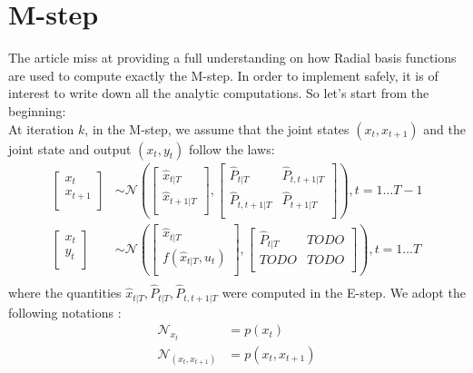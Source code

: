 \section{M-step}

The article miss at providing a full understanding on how Radial basis functions are used to compute exactly the M-step. In order to implement safely, it is of interest to write down all the analytic computations. So let's start from the beginning:\\

At iteration $k$, in the M-step, we assume that the joint states $(x_t, x_{t+1})$ and the joint state and output $(x_t, y_t)$ follow the laws:
\begin{align*}
  \left[ \begin{array}{c} x_{t}\\ x_{t+1}\\ \end{array} \right] &\sim
    \mathcal{N}\left(
      \left[ \begin{array}{c} \hat{x}_{t|T}\\ \hat{x}_{t+1|T}\\ \end{array} \right],
      \left[ \begin{array}{cc} \hat{P}_{t|T} & \hat{P}_{t,t+1|T}\\ \hat{P}_{t,t+1|T} & \hat{P}_{t+1|T}\\ \end{array} \right]
    \right),
    t=1 \ldots T-1\\
  \left[ \begin{array}{c} x_{t}\\ y_{t}\\ \end{array} \right] &\sim
    \mathcal{N}\left(
      \left[ \begin{array}{c} \hat{x}_{t|T}\\  f(\hat{x}_{t|T}, u_t)\\ \end{array} \right],
      \left[ \begin{array}{cc} \hat{P}_{t|T} & TODO \\ TODO & TODO\\ \end{array} \right]
    \right),
    t=1 \ldots T\\
\end{align*}
where the quantities $ \hat{x}_{t|T}, \hat{P}_{t|T}, \hat{P}_{t,t+1|T}$ were computed in the E-step.
We adopt the following notations :
\begin{align*}
  \mathcal{N}_{x_t} &= p(x_t)\\
  \mathcal{N}_{(x_t,x_{t+1})} &= p(x_t, x_{t+1})\\
\end{align*}


